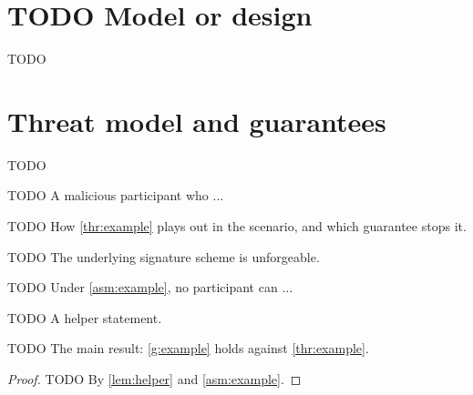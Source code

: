 \section{TODO Model or design}
TODO

\section{Threat model and guarantees}
TODO

\begin{threats}
  \item\label{thr:example} TODO A malicious participant who ...
\end{threats}

\begin{runningexample}
TODO How \cref{thr:example} plays out in the scenario, and which guarantee stops it.
\end{runningexample}

\begin{assumptions}
  \item\label{asm:example} TODO The underlying signature scheme is unforgeable.
\end{assumptions}

\begin{guarantees}
  \item\label{g:example} TODO Under \cref{asm:example}, no participant can ...
\end{guarantees}

\begin{lemma}[TODO]\label{lem:helper}
TODO A helper statement.
\end{lemma}

\begin{theorem}[TODO]\label{thm:main}
TODO The main result: \cref{g:example} holds against \cref{thr:example}.
\end{theorem}

\begin{proof}
TODO By \cref{lem:helper} and \cref{asm:example}.
\end{proof}
